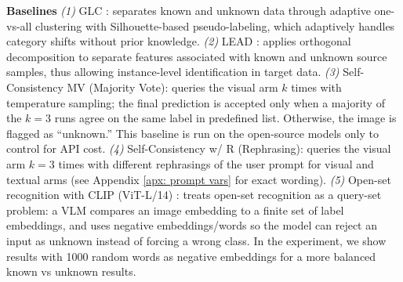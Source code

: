 \documentclass[10pt]{article} %
\begin{document}
% 
\textbf{Baselines}
%
    {\em (1)} GLC \citep{qu2023upcycling}: separates known and unknown data through adaptive one-vs-all clustering with Silhouette-based pseudo-labeling, which adaptively handles category shifts without prior knowledge.
    {\em (2)} LEAD \citep{qu2024lead}: applies orthogonal decomposition to separate features associated with known and unknown source samples, thus allowing instance-level identification in target data.
    {\em (3)} Self-Consistency MV (Majority Vote)\citep{wang2022self}: queries the visual arm $k$ times with temperature sampling; the final prediction is accepted only when a majority of the $k=3$ runs agree on the same label in predefined list. Otherwise, the image is flagged as ``unknown.'' This baseline is run on the open-source models only to control for API cost.
    {\em (4)} Self-Consistency w/ R (Rephrasing)\citep{khan2024consistency}: queries the visual arm $k=3$ times with different rephrasings of the user prompt for visual and textual arms (see Appendix \ref{apx: prompt vars} for exact wording).  
    {\em (5)} Open-set recognition with CLIP (ViT-L/14) \citep{miller2024open}: treats open-set recognition as a query-set problem: a VLM compares an image embedding to a finite set of label embeddings, and uses negative embeddings/words so the model can reject an input as unknown instead of forcing a wrong class. In the experiment, we show results with 1000 random words as negative embeddings for a more balanced known vs unknown results.
\end{document}
